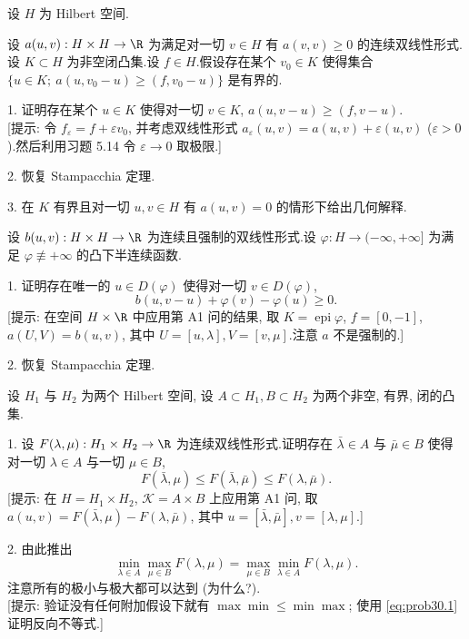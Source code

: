 \begin{problem}[第 3, 5 章]
\label{prob:30}
设 $H$ 为 Hilbert 空间.


设 $a(u,v):H\times H\to\R$ 为满足对一切 $v\in H$ 有 $a(v,v)\ge0$ 的连续双线性形式.
设 $K\subset H$ 为非空闭凸集.设 $f\in H$.假设存在某个 $v_0\in K$ 使得集合
$\{u\in K;\ a(u,v_0-u)\ge(f,v_0-u)\}$ 是有界的.

1. 证明存在某个 $u\in K$ 使得对一切 $v\in K$, $a(u,v-u)\ge(f,v-u)$.\\
{[提示: 令 $f_\varepsilon=f+\varepsilon v_0$, 并考虑双线性形式
$a_\varepsilon(u,v)=a(u,v)+\varepsilon(u,v)$ ($\varepsilon>0$).然后利用习题 5.14
令 $\varepsilon\to0$ 取极限.]}

2. 恢复 Stampacchia 定理.

3. 在 $K$ 有界且对一切 $u,v\in H$ 有 $a(u,v)=0$ 的情形下给出几何解释.


设 $b(u,v):H\times H\to\R$ 为连续且强制的双线性形式.设 $\varphi:H\to(-\infty,+\infty]$
为满足 $\varphi\not\equiv+\infty$ 的凸下半连续函数.

1. 证明存在唯一的 $u\in D(\varphi)$ 使得对一切 $v\in D(\varphi)$,
\begin{equation*}
b(u,v-u)+\varphi(v)-\varphi(u)\ge0.
\end{equation*}
[提示: 在空间 $H\times\R$ 中应用第 A1 问的结果, 取 $K=\operatorname{epi}\varphi$,
$f=[0,-1]$, $a(U,V)=b(u,v)$, 其中 $U=[u,\lambda],V=[v,\mu]$.注意 $a$ 不是强制的.]

2. 恢复 Stampacchia 定理.


设 $H_1$ 与 $H_2$ 为两个 Hilbert 空间, 设 $A\subset H_1,B\subset H_2$ 为两个非空, 有界, 闭的凸集.

1. 设 $F(\lambda,\mu):H_1\times H_2\to\R$ 为连续双线性形式.证明存在 $\bar\lambda\in A$
与 $\bar\mu\in B$ 使得对一切 $\lambda\in A$ 与一切 $\mu\in B$,
\begin{equation}
F(\bar\lambda,\mu)\le F(\bar\lambda,\bar\mu)\le F(\lambda,\bar\mu).
\label{eq:prob30.1}
\end{equation}
[提示: 在 $H=H_1\times H_2$, $\mathcal{K}=A\times B$ 上应用第 A1 问, 取
$a(u,v)=F(\bar\lambda,\mu)-F(\lambda,\bar\mu)$, 其中 $u=[\bar\lambda,\bar\mu],v=[\lambda,\mu]$.]

2. 由此推出
\begin{equation}
\min_{\lambda\in A}\max_{\mu\in B}F(\lambda,\mu)=\max_{\mu\in B}\min_{\lambda\in A}F(\lambda,\mu).
\label{eq:prob30.2}
\end{equation}
注意所有的极小与极大都可以达到 (为什么?).\\
{[提示: 验证没有任何附加假设下就有 $\max\min\le\min\max$; 使用 \eqref{eq:prob30.1}
证明反向不等式.]}


\end{problem}
